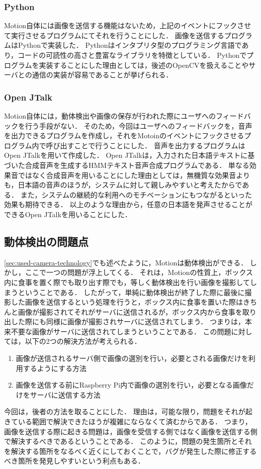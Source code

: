 \documentclass[../report]{subfiles}
\begin{document}
\subsubsection{Python}
Motion自体には画像を送信する機能はないため，上記のイベントにフックさせて実行させるプログラムにてそれを行うことにした．
画像を送信するプログラムはPythonで実装した．
Pythonはインタプリタ型のプログラミング言語であり，コードの可読性の高さと豊富なライブラリを特徴としている．
Pythonでプログラムを実装することにした理由としては，後述のOpenCVを扱えることやサーバとの通信の実装が容易であることが挙げられる．

\subsubsection{Open JTalk}
Motion自体には，動体検出や画像の保存が行われた際にユーザへのフィードバックを行う手段がない．
そのため，今回はユーザへのフィードバックを，音声を出力できるプログラムを作成し，それをMotoinのイベントにフックさせるプログラム内で呼び出すことで行うことにした．
音声を出力するプログラムはOpen JTalkを用いて作成した．
Open JTalkは，入力された日本語テキストに基づいた合成音声を生成するHMMテキスト音声合成プログラムである．
単なる効果音ではなく合成音声を用いることにした理由としては，無機質な効果音よりも，日本語の音声のほうが，システムに対して親しみやすいと考えたからである．
また，システムの継続的な利用へのモチベーションにもつながるといった効果も期待できる．
以上のような理由から，任意の日本語を発声させることができるOpen JTalkを用いることにした．

\subsection{動体検出の問題点} \label{sec:problem-detect-motion}
\ref{sec:used-camera-technology}でも述べたように，Motionは動体検出ができる．
しかし，ここで一つの問題が浮上してくる．
それは，Motionの性質上，ボックス内に食事を置く際でも取り出す際でも，等しく動体検出を行い画像を撮影してしまうということである．
したがって，単純に動体検出が終了した際に最後に撮影した画像を送信するという処理を行うと，ボックス内に食事を置いた際はきちんと画像が撮影されてそれがサーバに送信されるが，ボックス内から食事を取り出した際にも同様に画像が撮影されサーバに送信されてしまう．
つまりは，本来不要な画像がサーバに送信されてしまうということである．
この問題に対しては，以下の2つの解決方法が考えられる．
\begin{enumerate}
    \item 画像が送信されるサーバ側で画像の選別を行い，必要とされる画像だけを利用するようにする方法
    \item 画像を送信する前にRaspberry Pi内で画像の選別を行い，必要となる画像だけをサーバに送信する方法
\end{enumerate}
今回は，後者の方法を取ることにした．
理由は，可能な限り，問題をそれが起きている範囲で解決できたほうが複雑にならなくて済むからである．
つまり，画像を送信する際に起きる問題は，画像を受信する側ではなく画像を送信する側で解決するべきであるということである．
このように，問題の発生箇所とそれを解決する箇所をなるべく近くにしておくことで，バグが発生した際に修正するべき箇所を発見しやすいという利点もある．
\end{document}
